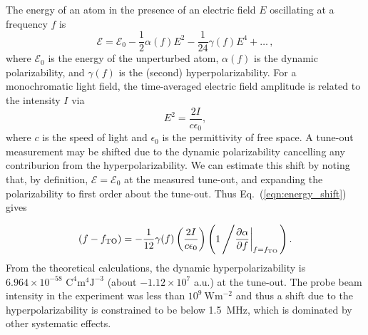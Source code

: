 	The energy of an atom in the presence of an electric field \(E\) oscillating at a frequency \(f\) is 
	\begin{equation}
	\mathcal{E}=\mathcal{E}_0 - \frac{1}{2} \alpha(f) E^2 - \frac{1}{24} \gamma(f) E^4 + \ldots \, , \label{eqn:energy_shift}
	\end{equation}
	where \(\mathcal{E}_0\) is the energy of the unperturbed atom, \(\alpha(f)\) is the dynamic polarizability, and \(\gamma(f)\) is the (second) hyperpolarizability.  
	For a monochromatic light field, the time-averaged electric field amplitude is related to the intensity $I$ via
	\begin{equation}
	    E^2=\frac{2 I}{c \epsilon_0},
	\end{equation}
	where \(c\) is the speed of light and \(\epsilon_0\) is the permittivity of free space. 
	A tune-out measurement may be shifted due to the dynamic polarizability cancelling any contriburion from the hyperpolarizability. 
	We can estimate this shift by noting that, by definition, \(\mathcal{E}=\mathcal{E}_0\) at the measured tune-out, and expanding the polarizability to first order about the tune-out.
	Thus Eq.~(\ref{eqn:energy_shift}) gives 
	
	\begin{equation}
	 (f-f_\mathrm{TO} ) = - \frac{1}{12} \gamma(f) \left(\frac{2 I}{c \epsilon_0}\right) \left(1\left/ \frac{\partial\alpha}{\partial f}\bigg|_{f=f_\mathrm{TO}} \right. \right).
	\end{equation}
	From the theoretical calculations, the dynamic hyperpolarizability  is $6.964\times10^{-58}$ $\mathrm{C}^4\mathrm{m}^4\mathrm{J}^{-3}$ (about $-1.12\times10^{7}$ a.u.) at the tune-out. The probe beam intensity in the experiment was less than $10^{9}\: \mathrm{W} \mathrm{m}^{-2}$ and thus a shift due to the hyperpolarizability is  constrained to be below 1.5~MHz, which is dominated by other systematic effects.


